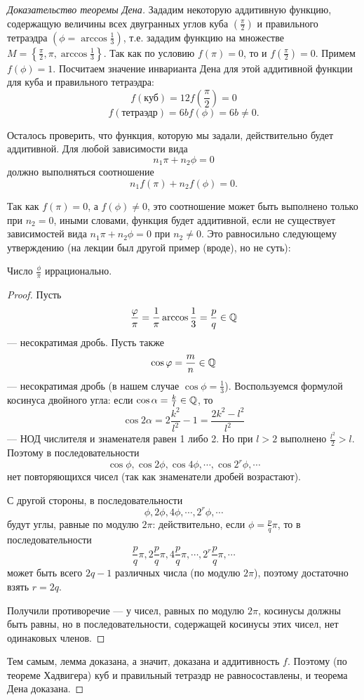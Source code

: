 \begin{proof}[Доказательство теоремы Дена]
    Зададим некоторую аддитивную функцию, содержащую величины всех двугранных углов куба $\left(\frac{\pi}{2}\right)$ и правильного тетраэдра $\left(\phi = \arccos{\frac{1}{3}}\right)$, т.е. зададим функцию на множестве $M = \left\{\frac{\pi}{2}, \pi, \arccos{\frac{1}{3}}\right\}$.
    Так как по условию $f(\pi) = 0$, то и $f(\frac{\pi}{2}) = 0$. Примем $f(\phi) = 1$. Посчитаем значение инварианта Дена для этой аддитивной функции для куба и правильного тетраэдра:
    \[f(\text{куб}) = 12 f(\frac{\pi}{2}) = 0\]
    \[f(\text{тетраэдр}) = 6bf(\phi) = 6b \neq 0.\]

    Осталось проверить, что функция, которую мы задали, действительно будет аддитивной. Для любой зависимости вида $$n_1 \pi + n_2 \phi = 0$$ должно выполняться соотношение $$n_1 f(\pi) + n_2 f(\phi) = 0.$$

    Так как $f(\pi) = 0$, а $f(\phi) \neq 0$, это соотношение может быть выполнено только при $n_2 = 0$, иными словами, функция будет аддитивной, если не существует зависимостей вида $n_1 \pi + n_2 \phi = 0$ при $n_2 \neq 0$. Это равносильно следующему утверждению (на лекции был другой пример (вроде), но не суть):

    \begin{lemma}
        Число $\frac{\phi}{\pi}$ иррационально.
    \end{lemma} 
    \begin{proof}
        Пусть $$\frac{\varphi}{\pi} = \frac{1}{\pi} \arccos{\frac{1}{3}} = \frac{p}{q} \in \mathbb{Q}$$ — несократимая дробь.
        Пусть также $$\cos{\varphi} = \frac{m}{n} \in \mathbb{Q}$$ — несократимая дробь (в нашем случае $\cos{\phi} = \frac{1}{3}$).
        Воспользуемся формулой косинуса двойного угла: если $\cos{\alpha} = \frac{k}{l} \in \mathbb{Q}$, то
        $$\cos{2\alpha} = 2 \frac{k^2}{l^2} - 1 = \frac{2k^2 - l^2}{l^2}$$ — НОД числителя и знаменателя равен 1 либо 2. Но при $l > 2$ выполнено $\frac{l^2}{2} > l$. Поэтому в последовательности $$\cos{\phi}, \cos{2\phi}, \cos{4\phi}, \cdots, \cos{2^r \phi}, \cdots$$ нет повторяющихся чисел (так как знаменатели дробей возрастают).

        С другой стороны, в последовательности
        $$\phi, 2\phi, 4\phi, \cdots, 2^r \phi, \cdots$$
        будут углы, равные по модулю $2 \pi$: действительно, если $\phi = \frac{p}{q} \pi$, то в последовательности
        $$\frac{p}{q} \pi, 2 \frac{p}{q} \pi, 4 \frac{p}{q} \pi, \cdots, 2^r \frac{p}{q} \pi, \cdots$$
        может быть всего $2q - 1$ различных числа (по модулю $2 \pi$), поэтому достаточно взять $r = 2q$.

        Получили противоречие — у чисел, равных по модулю $2 \pi$, косинусы должны быть равны, но в последовательности, содержащей косинусы этих чисел, нет одинаковых членов.
    \end{proof}
    Тем самым, лемма доказана, а значит, доказана и аддитивность $f$. Поэтому (по теореме Хадвигера) куб и правильный тетраэдр не равносоставлены, и теорема Дена доказана.
\end{proof}

